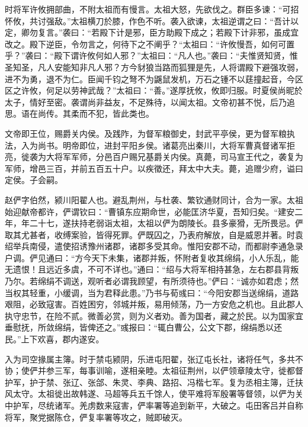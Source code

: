 \documentclass[12pt,UTF8]{ctexbook}
\begin{document}
时将军许攸拥部曲，不附太祖而有慢言。太祖大怒，先欲伐之。群臣多谏：“可招怀攸，共讨强敌。”太祖横刀於膝，作色不听。袭入欲谏，太祖逆谓之曰：“吾计以定，卿勿复言。”袭曰：“若殿下计是邪，臣方助殿下成之；若殿下计非邪，虽成宜改之。殿下逆臣，令勿言之，何待下之不阐乎？“太祖曰：“许攸慢吾，如何可置乎？”袭曰：“殿下谓许攸何如人邪？”太祖曰：“凡人也。”袭曰：“夫惟贤知贤，惟圣知圣，凡人安能知非凡人邪？方今豺狼当路而狐狸是先，人将谓殿下避强攻弱，进不为勇，退不为仁。臣闻千钧之弩不为鼷鼠发机，万石之锺不以莛撞起音，今区区之许攸，何足以劳神武哉？”太祖曰：“善。”遂厚抚攸，攸即归服。时夏侯尚昵於太子，情好至密。袭谓尚非益友，不足殊待，以闻太祖。文帝初甚不悦，后乃追思。语在尚传。其柔而不犯，皆此类也。

文帝即王位，赐爵关内侯。及践阼，为督军粮御史，封武平亭侯，更为督军粮执法，入为尚书。明帝即位，进封平阳乡侯。诸葛亮出秦川，大将军曹真督诸军拒亮，徙袭为大将军军师，分邑百户赐兄基爵关内侯。真薨，司马宣王代之，袭复为军师，增邑三百，并前五百五十户。以疾徵还，拜太中大夫。薨，追赠少府，谥曰定侯。子会嗣。

赵俨字伯然，颍川阳翟人也。避乱荆州，与杜袭、繁钦通财同计，合为一家。太祖始迎献帝都许，俨谓钦曰：“曹镇东应期命世，必能匡济华夏，吾知归矣。“建安二年，年二十七，遂扶持老弱诣太祖，太祖以俨为朗陵长。县多豪猾，无所畏忌。俨取其尤甚者，收缚案验，皆得死罪。俨既囚之，乃表府解放，自是威恩并著。时袁绍举兵南侵，遣使招诱豫州诸郡，诸郡多受其命。惟阳安郡不动，而都尉李通急录户调。俨见通曰：“方今天下未集，诸郡并叛，怀附者复收其绵绢，小人乐乱，能无遗恨！且远近多虞，不可不详也。”通曰：“绍与大将军相持甚急，左右郡县背叛乃尔。若绵绢不调送，观听者必谓我顾望，有所须待也。”俨曰：“诚亦如君虑；然当权其轻重，小缓调，当为君释此患。”乃书与荀彧曰：“今阳安郡当送绵绢，道路艰阻，必致寇害。百姓困穷，邻城并叛，易用倾荡，乃一方安危之机也。且此郡人执守忠节，在险不贰。微善必赏，则为义者劝。善为国者，藏之於民。以为国家宜垂慰抚，所敛绵绢，皆俾还之。”彧报曰：“辄白曹公，公文下郡，绵绢悉以还民。”上下欢喜，郡内遂安。

入为司空掾属主簿。时于禁屯颍阴，乐进屯阳翟，张辽屯长社，诸将任气，多共不协；使俨并参三军，每事训喻，遂相亲睦。太祖征荆州，以俨领章陵太守，徙都督护军，护于禁、张辽、张郃、朱灵、李典、路招、冯楷七军。复为丞相主簿，迁扶风太守。太祖徙出故韩遂、马超等兵五千馀人，使平难将军殷署等督领，以俨为关中护军，尽统诸军。羌虏数来寇害，俨率署等追到新平，大破之。屯田客吕并自称将军，聚党据陈仓，俨复率署等攻之，贼即破灭。
\end{document}
